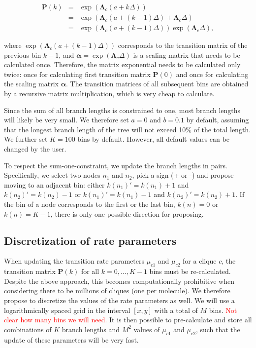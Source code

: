 \documentclass[a4paper,11pt]{article}
\newcommand{\hl}[1]{\textcolor{red}{#1}}
\def\balpha{\boldsymbol{\alpha}}
\def\bLambda{\boldsymbol{\Lambda}}
\def\bP{\boldsymbol{P}}
\begin{document}
\begin{eqnarray*}
  \bP(k) &=& \exp(\bLambda_c (a + k\Delta))\\
         &=& \exp(\bLambda_c (a + (k-1)\Delta) + \bLambda_c \Delta)\\
         &=& \exp(\bLambda_c (a + (k-1)\Delta)) \exp( \bLambda_c \Delta),
\end{eqnarray*}

where $\exp(\bLambda_c (a + (k-1)\Delta))$ corresponds to the transition matrix of the previous bin $k-1$, and $\balpha = \exp( \bLambda_c \Delta)$ is a scaling matrix that needs to be calculated once. Therefore, the matrix exponential needs to be calculated only twice: once for calculating first transition matrix $\bP(0)$ and once for calculating the scaling matrix $\balpha$. The transition matrices of all subsequent bins are obtained by a recursive matrix multiplication, which is very cheap to calculate.

Since the sum of all branch lengths is constrained to one, most branch lengths will likely be very small. We therefore set $a=0$ and $b=0.1$ by default, assuming that the longest branch length of the tree will not exceed 10\% of the total length. We further set $K=100$ bins by default. However, all default values can be changed by the user.

To respect the sum-one-constraint, we update the branch lengths in pairs. Specifically, we select two nodes $n_1$ and $n_2$, pick a sign (+ or -) and propose moving to an adjacent bin: either $k(n_1)' = k(n_1) + 1$ and $k(n_2)' = k(n_2) - 1$ or $k(n_1)' = k(n_1) - 1$ and $k(n_2)' = k(n_2) + 1$. If the bin of a node corresponds to the first or the last bin, $k(n) = 0$ or $k(n) = K-1$, there is only one possible direction for proposing.

\subsection{Discretization of rate parameters}

When updating the transition rate parameters $\mu_{c1}$ and $\mu_{c2}$ for a clique $c$, the transition matrix $\bP(k)$ for all $k=0, \ldots, K-1$ bins must be re-calculated. Despite the above approach, this becomes computationally prohibitive when considering there to be millions of cliques (one per molecule).
We therefore propose to discretize the values of the rate parameters as well. We will use a logarithmically spaced grid in the interval $[x, y]$ with a total of $M$ bins. \hl{Not clear how many bins we will need.} It is then possible to pre-calculate and store all combinations of $K$ branch lengths and $M^2$ values of $\mu_{c1}$ and $\mu_{c2}$, such that the update of these parameters will be very fast.


\printbibliography
\end{document}

